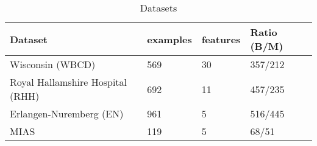 \medskip
\begin{table}[ht!]
\begin{adjustwidth}{-5.in}{-5.in}
\begin{center}
   \begin{tabular}{l*{3}{l}}
   \hline
   Dataset         &
   examples  &
   features  &
   Ratio (B/M)     \\
   \hline
   Wisconsin (WBCD)						 &
   569                         &
   30                          &
   357/212                     \\
   Royal Hallamshire Hospital (RHH)  &
   692                         &
   11                          &
   457/235                     \\
   Erlangen-Nuremberg (EN)     &
   961                         &
   5                           &
   516/445                     \\
   MIAS         							 &
   119                         &
   5                           &
   68/51                     	 \\
  \hline
  \end{tabular}
  \caption{Datasets}
  \label{table:datasets_info}
\end{center}
\end{adjustwidth}
\end{table}
